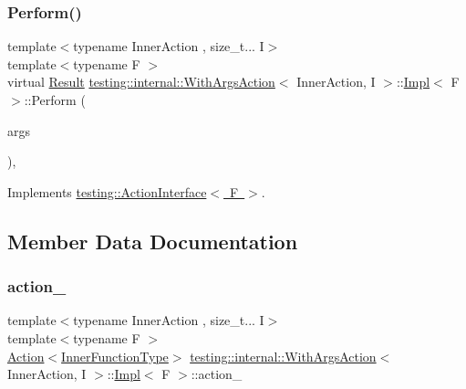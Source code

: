 \subsubsection{\texorpdfstring{Perform()}{Perform()}}
{\footnotesize\ttfamily template$<$typename Inner\+Action , size\+\_\+t... I$>$ \\
template$<$typename F $>$ \\
virtual \mbox{\hyperlink{classtesting_1_1_action_interface_a7477de2fe3e4e01c59db698203acaee7}{Result}} \mbox{\hyperlink{structtesting_1_1internal_1_1_with_args_action}{testing\+::internal\+::\+With\+Args\+Action}}$<$ Inner\+Action, I $>$\+::\mbox{\hyperlink{classtesting_1_1internal_1_1_with_args_action_1_1_impl}{Impl}}$<$ F $>$\+::Perform (\begin{DoxyParamCaption}\item[{const \mbox{\hyperlink{classtesting_1_1_action_interface_af72720d864da4d606629e83edc003511}{Argument\+Tuple}} \&}]{args }\end{DoxyParamCaption})\hspace{0.3cm}{\ttfamily [inline]}, {\ttfamily [virtual]}}



Implements \mbox{\hyperlink{classtesting_1_1_action_interface_a20f8624fcea1786f2992b358760422a0}{testing\+::\+Action\+Interface$<$ F $>$}}.



\subsection{Member Data Documentation}
\mbox{\label{classtesting_1_1internal_1_1_with_args_action_1_1_impl_a221640d183f6d2b0968720b310a2d661}} 
\subsubsection{\texorpdfstring{action\_}{action\_}}
{\footnotesize\ttfamily template$<$typename Inner\+Action , size\+\_\+t... I$>$ \\
template$<$typename F $>$ \\
\mbox{\hyperlink{classtesting_1_1_action}{Action}}$<$\mbox{\hyperlink{classtesting_1_1internal_1_1_with_args_action_1_1_impl_ae7e21dae071e88eb5889c9d14e0b5212}{Inner\+Function\+Type}}$>$ \mbox{\hyperlink{structtesting_1_1internal_1_1_with_args_action}{testing\+::internal\+::\+With\+Args\+Action}}$<$ Inner\+Action, I $>$\+::\mbox{\hyperlink{classtesting_1_1internal_1_1_with_args_action_1_1_impl}{Impl}}$<$ F $>$\+::action\+\_\+\hspace{0.3cm}{\ttfamily [private]}}



